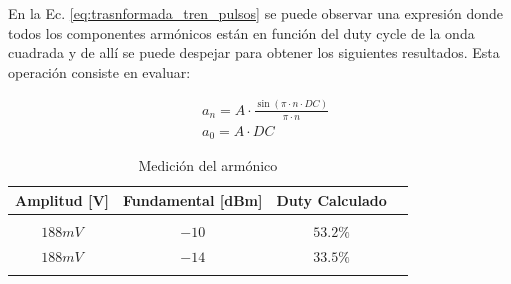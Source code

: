 En la Ec. \ref{eq:trasnformada_tren_pulsos} se puede observar una expresi\'on donde todos los componentes arm\'onicos est\'an en funci\'on del duty cycle de la onda
cuadrada y de all\'i se puede despejar para obtener los siguientes resultados. Esta operaci\'on consiste en evaluar:

\begin{align*}
    & a_n = A \cdot \frac{ \sin{\left( \pi \cdot n \cdot DC \right)} }{\pi \cdot n} \\
    & a_0 = A \cdot DC
\end{align*}
 
\begin{table}[H]
    \centering
    \begin{tabular}{c c c c}
        Amplitud [V] & Fundamental [dBm] & Duty Calculado \\
        \hline \\
        $188mV$ & $-10$ & $53.2 \%$ \\
        $188mV$ & $-14$ & $33.5 \%$\\
        \hline \\
    \end{tabular}
    \caption{Medici\'on del arm\'onico}
\end{table}
